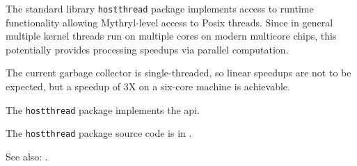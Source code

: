 
The standard library {\tt hostthread} package implements access to runtime functionality allowing 
Mythryl-level access to  Posix threads.  Since in 
general multiple kernel threads run on multiple cores on modern multicore chips, this 
potentially provides processing speedups via parallel computation. 

The current garbage collector is single-threaded, so linear speedups are not to be expected,
but a speedup of 3X on a six-core machine is achievable.

The {\tt hostthread} package implements the  api.

The {\tt hostthread} package source code is in .

See also:    .
